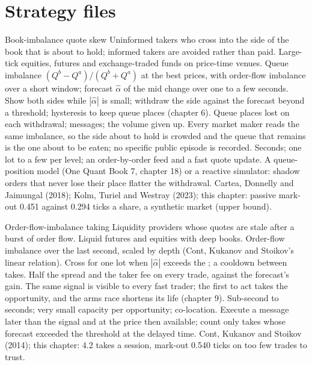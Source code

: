 \section{Strategy files}

\begin{strategyfile}{Book-imbalance quote skew}\label{strat:hf:short-horizon-alpha:imbalance}
 Uninformed takers who cross into the side of the book that is about to hold; informed takers are avoided rather
than paid.
 Large-tick equities, futures and exchange-traded funds on price-time venues.
 Queue imbalance $(Q^b-Q^a)/(Q^b+Q^a)$ at the best prices, with order-flow imbalance over a short window; forecast $\hat\alpha$ of the mid
change over one to a few seconds.
 Show both sides while $|\hat\alpha|$ is small; withdraw the side against the forecast beyond a threshold; hysteresis to
keep queue places (chapter 6).
 Queue places lost on each withdrawal; messages; the volume given up.
 Every market maker reads the same imbalance, so the side about to hold is crowded and the queue that remains is the one about
to be eaten; no specific public episode is recorded.
 Seconds; one lot to a few per level; an order-by-order feed and a fast quote update.
 A queue-position model (One Quant Book 7, chapter 18) or a reactive simulator: shadow orders that never lose their place
flatter the withdrawal.
 Cartea, Donnelly and Jaimungal (2018); Kolm, Turiel and Westray (2023); this chapter: passive mark-out 0.451 against 0.294 ticks a
share, a synthetic market (upper bound).
\end{strategyfile}

\begin{strategyfile}{Order-flow-imbalance taking}\label{strat:hf:short-horizon-alpha:ofi}
 Liquidity providers whose quotes are stale after a burst of order flow.
 Liquid futures and equities with deep books.
 Order-flow imbalance over the last second, scaled by depth (Cont, Kukanov and Stoikov's linear relation).
 Cross for one lot when $|\hat\alpha|$ exceeds the ; a cooldown between takes.
 Half the spread and the taker fee on every trade, against the forecast's gain.
 The same signal is visible to every fast trader; the first to act takes the opportunity, and the arms race shortens its life
(chapter 9).
 Sub-second to seconds; very small capacity per opportunity; co-location.
 Execute a message later than the signal and at the price then available; count only takes whose forecast exceeded the
threshold at the delayed time.
 Cont, Kukanov and Stoikov (2014); this chapter: 4.2 takes a session, mark-out 0.540 ticks on too few trades to trust.
\end{strategyfile}

